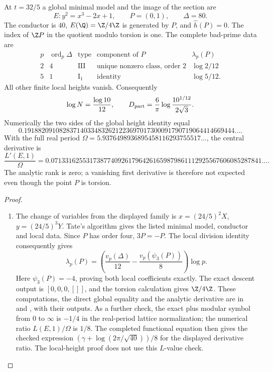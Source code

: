 \begin{proposition}\hypertarget{tag-0015}{}\label{ari:C.6.T1}

At $t=32/5$ a global minimal model and the image of the section are
\[
 E:y^2=x^3-2x+1,\qquad P=(0,1),\qquad \Delta=80.
\]
The conductor is $40$, $E(\Q)=\Z/4\Z$ is generated by $P$,
and $\widehat h(P)=0$. The index of $\Z P$ in the quotient
modulo torsion is one. The complete bad-prime data are
\[
\begin{array}{c|c|c|c|c}
p&\operatorname{ord}_p\Delta&\text{type}&\text{component of }P&\lambda_p(P)\\\hline
2&4&\mathrm{III}&\text{unique nonzero class, order }2&\log2/12\\
5&1&\mathrm I_1&\text{identity}&\log5/12.
\end{array}
\]
All other finite local heights vanish. Consequently
\[
 \log N=\frac{\log10}{12},\qquad
 D_{\rm part}=\frac6\pi\log\frac{10^{1/12}}{2\sqrt3}.
\]
Numerically the two sides of the global height identity equal
\[
 0.191882091082837140334832621223697017300091790719064414669444\ldots.
\]
With the full real period $\Omega=5.9376498936895458116293755517\ldots$,
the central derivative is
\[
 \frac{L'(E,1)}\Omega=
 0.071331625531738774092617964261659879861112925567606085287841\ldots.
\]
The analytic rank is zero; a vanishing first derivative is therefore
not expected even though the point $P$ is torsion.
\end{proposition}


\begin{proof}
\begin{enumerate}[label=\arabic*.,leftmargin=*]
\item The change of variables from the displayed family is
$x=(24/5)^2X$, $y=(24/5)^3Y$. Tate's algorithm gives the
listed minimal model, conductor and local data. Since $P$ has
order four, $3P=-P$. The local division identity consequently
gives
\[
 \lambda_p(P)=\left(\frac{v_p(\Delta)}{12}
                         -\frac{v_p(\psi_3(P))}{8}\right)\log p.
\]
Here $\psi_3(P)=-4$, proving both local coefficients exactly.
The exact descent output is $[0,0,0,[]]$, and the torsion
calculation gives $\Z/4\Z$. These computations, the direct
global equality and the analytic derivative are in
 and
, with their outputs.
As a further check, the exact plus modular symbol from $0$ to
$\infty$ is $-1/4$ in the real-period lattice normalization;
the numerical ratio $L(E,1)/\Omega$ is $1/8$. The completed
functional equation then gives the checked expression
$(\gamma+\log(2\pi/\sqrt{40}))/8$ for the displayed derivative
ratio. The local-height proof does not use this $L$-value check.
\end{enumerate}
\end{proof}

